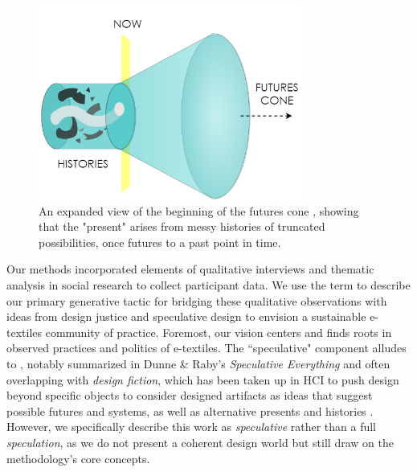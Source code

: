 \begin{figure}
  \centering
  \includegraphics[height=2.5in]{figs/EST_Future Cone.png}
  \caption[Illustration combining the ``futures cone'' from speculative design with design justice's acknowledgement of historical violence.]{An expanded view of the beginning of the futures cone \cite{dunne_speculative_2013}, showing that the "present" arises from messy histories of truncated possibilities, once futures to a past point in time.}
  \label{fig:justice-futures-cone}
\end{figure}

Our methods incorporated elements of qualitative interviews \cite{braun_online_2020, fontana_interviewing_2007} and thematic analysis \cite{maguire_doing_2017, braun_using_2006} in social research to collect participant data.
We use the term  to describe our primary generative tactic for bridging these qualitative observations with ideas from design justice and speculative design to envision a sustainable e-textiles community of practice. Foremost, our vision centers  \cite{costanza-chock_design_2020} and finds roots in observed practices and politics of e-textiles. The ``speculative" component alludes to , notably summarized in Dunne \& Raby's \textit{Speculative Everything} \cite{dunne_speculative_2013} and often overlapping with \textit{design fiction}, which has been taken up in HCI to push design beyond specific objects to consider designed artifacts as ideas that suggest possible futures and systems, as well as alternative presents and histories \cite{akama_speculative_2016, baumann_infrastructures_2017, wakkary_sustainable_2013}. However, we specifically describe this work as \textit{speculative} rather than a full \textit{speculation}, as we do not present a coherent design world but still draw on the methodology's core concepts.

